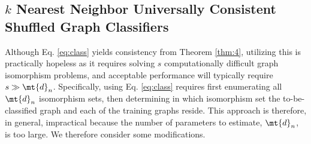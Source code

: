 
\subsection{$k$ Nearest Neighbor Universally Consistent Shuffled Graph Classifiers} %
\label{sec:a_practical_approach_to_unlabeled_graph_classification}

Although Eq. \eqref{eq:class} yields consistency from Theorem \ref{thm:4}, utilizing this is practically hopeless as it requires solving $s$ computationally difficult graph isomorphism problems, and acceptable performance will  typically require $s \gg \mt{d}_n$.  Specifically, using Eq. \eqref{eq:class} requires first enumerating  all $\mt{d}_n$ isomorphism sets, then determining in which isomorphism set the to-be-classified graph and each of the training graphs reside.  This approach is therefore, in general, impractical because the number of parameters to estimate, $\mt{d}_n$, is too large. We therefore consider some modifications.

